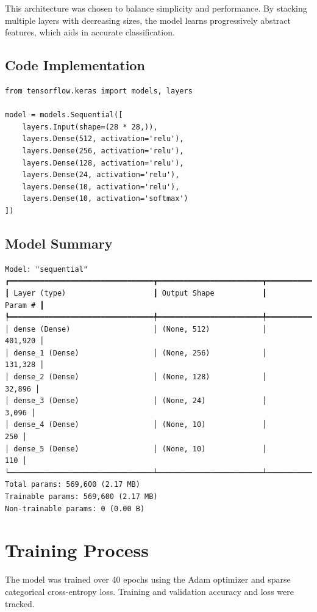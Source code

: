 \documentclass[12pt,a4paper]{article}
\begin{document}
This architecture was chosen to balance simplicity and performance. By stacking multiple layers with decreasing sizes, the model learns progressively abstract features, which aids in accurate classification.

\subsection*{Code Implementation}
\begin{lstlisting}
from tensorflow.keras import models, layers

model = models.Sequential([
    layers.Input(shape=(28 * 28,)),
    layers.Dense(512, activation='relu'),
    layers.Dense(256, activation='relu'),
    layers.Dense(128, activation='relu'),
    layers.Dense(24, activation='relu'),
    layers.Dense(10, activation='relu'),
    layers.Dense(10, activation='softmax')
])
\end{lstlisting}

\subsection*{Model Summary}
\begin{verbatim}
Model: "sequential"
┏━━━━━━━━━━━━━━━━━━━━━━━━━━━━━━━━━┳━━━━━━━━━━━━━━━━━━━━━━━━┳━━━━━━━━━━━━━━━┓
┃ Layer (type)                    ┃ Output Shape           ┃       Param # ┃
┡━━━━━━━━━━━━━━━━━━━━━━━━━━━━━━━━━╇━━━━━━━━━━━━━━━━━━━━━━━━╇━━━━━━━━━━━━━━━┩
│ dense (Dense)                   │ (None, 512)            │       401,920 │
│ dense_1 (Dense)                 │ (None, 256)            │       131,328 │
│ dense_2 (Dense)                 │ (None, 128)            │        32,896 │
│ dense_3 (Dense)                 │ (None, 24)             │         3,096 │
│ dense_4 (Dense)                 │ (None, 10)             │           250 │
│ dense_5 (Dense)                 │ (None, 10)             │           110 │
└─────────────────────────────────┴────────────────────────┴───────────────┘
Total params: 569,600 (2.17 MB)
Trainable params: 569,600 (2.17 MB)
Non-trainable params: 0 (0.00 B)
\end{verbatim}

\section*{Training Process}
The model was trained over 40 epochs using the Adam optimizer and sparse categorical cross-entropy loss. Training and validation accuracy and loss were tracked.
\end{document}
